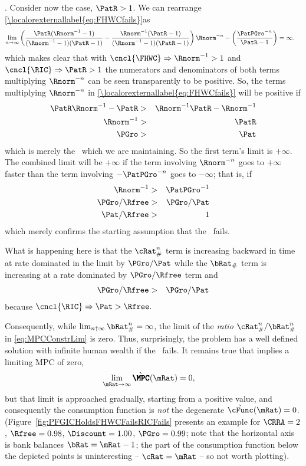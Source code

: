 \documentclass[\econtexRoot/BufferStockTheory.tex]{subfiles}
\begin{document}
.  Consider now the \cncl{\RIC} case, $\PatR > 1$.  We can rearrange \eqref{\localorexternallabel{eq:FHWCfails}}as
\begin{eqnarray}
 \lim_{n \rightarrow \infty} \left(\frac{\PatR(\Rnorm^{-1}-1)}{(\Rnorm^{-1}-1)(\PatR-1)}-\frac{\Rnorm^{-1}(\PatR-1)}{(\Rnorm^{-1}-1)(\PatR-1)}\right)\Rnorm^{-n}-\left(\frac{\PatPGro^{-n}}{\PatR-1}\right)  & = \infty.  
\end{eqnarray}
which makes clear that with $\cncl{\FHWC} \Rightarrow \Rnorm^{-1} > 1$ and $\cncl{\RIC} \Rightarrow \PatR > 1$ the numerators and denominators of both terms multiplying $\Rnorm^{-n}$ can be seen transparently to be positive.  So, the terms multiplying
$\Rnorm^{-n}$ in \eqref{\localorexternallabel{eq:FHWCfails}} will be positive if
\begin{eqnarray*}
  \PatR \Rnorm^{-1} - \PatR  & > & \Rnorm^{-1}\PatR-\Rnorm^{-1}
\\ \Rnorm^{-1}  & > & \PatR
\\ \PGro  & > & \Pat
\end{eqnarray*}
which is merely the \PFGIC~which we are maintaining.  So the first term's limit is $+\infty$.  The
combined limit will be $+\infty$ if the term involving $\Rnorm^{-n}$
goes to $+\infty$ faster than the term involving $-\PatPGro^{-n}$ goes to
$-\infty$; that is, if
\begin{eqnarray*}
  \Rnorm^{-1}  & > & \PatPGro^{-1}
\\ \PGro/\Rfree  & > & \PGro/\Pat
\\ \Pat/\Rfree  & > & 1
\end{eqnarray*}
which merely confirms the starting assumption that the \RIC~fails.

What is happening here is that the $\cRat_{\#}^{n}$ term is increasing backward in time at rate dominated in the limit by $\PGro/\Pat$ while the $\bRat_{\#}$ term is increasing at a rate dominated by $\PGro/\Rfree$ term and
\begin{eqnarray}
 \PGro/\Rfree & > & \PGro/\Pat 
\end{eqnarray}
because $\cncl{\RIC} \Rightarrow \Pat > \Rfree.$

Consequently, while $\lim_{n \uparrow \infty} \bRat_{\#}^{n} = \infty$, the limit of the \textit{ratio} $\cRat_{\#}^{n}/\bRat_{\#}^{n}$ in \eqref{eq:MPCConstrLim} is zero.
Thus, surprisingly, the problem has a well defined solution with
infinite human wealth if the \RIC~fails.  It remains true that \cncl{\RIC}
implies a limiting MPC of zero,
\begin{align}
  \lim_{\mRat \rightarrow \infty} \grave{\pmb{\MPC}}(\mRat)   & = 0,
\end{align}
but that limit is approached gradually, starting from a positive
value, and consequently the consumption function is {\it not} the
degenerate $\grave{\cFunc}(\mRat)=0$.  (Figure~\ref{fig:PFGICHoldsFHWCFailsRICFails} presents an example for $\CRRA=2$, $\Rfree=0.98$, $\Discount = 1.00$, $\PGro = 0.99$; note that the horizontal axis is bank balances $\bRat = \mRat-1$; the part of the consumption function below the depicted points is uninteresting -- $\cRat = \mRat$ -- so not worth plotting).
\end{document}
